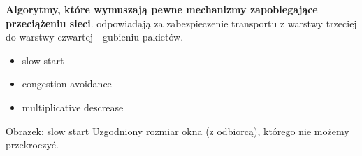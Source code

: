 \textbf{Algorytmy, które wymuszają pewne mechanizmy zapobiegające przeciążeniu sieci}. odpowiadają za zabezpieczenie transportu z warstwy trzeciej do warstwy czwartej - gubieniu pakietów.
\begin{itemize}
	\item slow start
	\item congestion avoidance
	\item multiplicative descrease
\end{itemize}

Obrazek: slow start
Uzgodniony rozmiar okna (z odbiorcą), którego nie możemy przekroczyć.